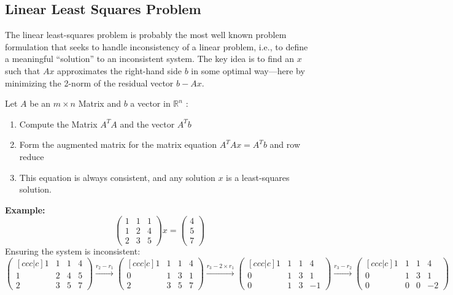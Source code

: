 \documentclass{article}
\begin{document}
					 \subsection{Linear Least Squares Problem}
				The linear least-squares problem is probably the most well known problem formulation that seeks to handle inconsistency of a linear problem, i.e., to define a meaningful “solution” to an inconsistent system. 
				\newline 
				The key idea is to find an $x$ such that $Ax$ approximates the right-hand side $b$ in some optimal way—here by minimizing the 2-norm of the residual vector $b - Ax$.
\begin{tcolorbox}[colback=seashell,colframe=beaublue,title=Recipe: Compute a least-squares solution ~\cite{recipe}]	
	Let $A$ be an $m \times n$ Matrix and $b$ a vector in $\mathbb{R}^{n}$ :  
	\begin{enumerate}
		\item Compute the Matrix $A^{T}A$ and the vector $A^{T}b$ 
		\item Form the augmented matrix for the matrix equation $A^{T}Ax = A^{T}b$ and row reduce
		\item This equation is always consistent, and any solution $x$ is a least-squares solution.
	\end{enumerate}
\end{tcolorbox}
\textbf{Example: }
	$$\begin{pmatrix} 1 & 1 & 1 \\ 1 & 2 & 4 \\ 2 & 3 & 5 \end{pmatrix}x = \begin{pmatrix} 4\\ 5 \\ 7 \end{pmatrix}$$
		Ensuring the system is inconsistent: 
		$$ \begin{pmatrix}[ccc|c] 1 & 1 & 1 & 4 \\ 1 & 2 & 4 & 5 \\ 2 & 3 & 5 & 7 \end{pmatrix} 
			\xrightarrow{r_2 - r_1}
			 \begin{pmatrix}[ccc|c] 1 & 1 & 1 & 4 \\ 0 & 1 & 3 & 1 \\ 2 & 3 & 5 & 7 \end{pmatrix}
				 \xrightarrow{r_3 - 2\times r_1}
                         \begin{pmatrix}[ccc|c] 1 & 1 & 1 & 4 \\ 0 & 1 & 3 & 1 \\ 0 & 1 & 3 & -1 \end{pmatrix}
                            \xrightarrow{r_3 - r_2}
                         \begin{pmatrix}[ccc|c] 1 & 1 & 1 & 4 \\ 0 & 1 & 3 & 1 \\ 0 & 0 & 0 & -2 \end{pmatrix} $$
\end{document}
